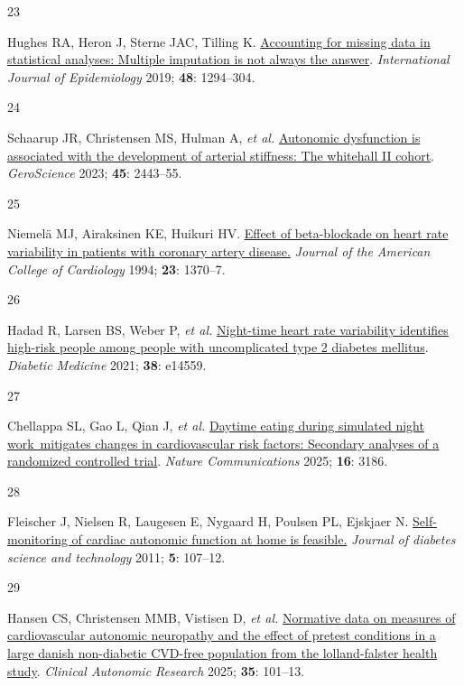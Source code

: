 \documentclass[
  a4paper,
  headsepline=true,
  open=any]{scrbook}
\newlength{\cslhangindent}
\newlength{\csllabelwidth}
\newlength{\cslentryspacingunit} %
\newenvironment{CSLReferences}[2] %
 {%
  \setlength{\parindent}{0pt}
  \ifodd #1
  \let\oldpar\par
  \def\par{\hangindent=\cslhangindent\oldpar}
  \fi
  \setlength{\parskip}{#2\cslentryspacingunit}
 }%
 {}
\newcommand{\CSLLeftMargin}[1]{\parbox[t]{\csllabelwidth}{#1}}
\newcommand{\CSLRightInline}[1]{\parbox[t]{\linewidth - \csllabelwidth}{#1}\break}
\begin{document}
\begin{CSLReferences}{0}{0}
\leavevmode{}%
\CSLLeftMargin{23 }%
\CSLRightInline{Hughes RA, Heron J, Sterne JAC, Tilling K.
\href{https://doi.org/10.1093/ije/dyz032}{Accounting for missing data in
statistical analyses: Multiple imputation is not always the answer}.
\emph{International Journal of Epidemiology} 2019; \textbf{48}:
1294--304.}

\leavevmode{}%
\CSLLeftMargin{24 }%
\CSLRightInline{Schaarup JR, Christensen MS, Hulman A, \emph{et al.}
\href{https://doi.org/10.1007/s11357-023-00762-0}{Autonomic dysfunction
is associated with the development of arterial stiffness: The whitehall
II cohort}. \emph{GeroScience} 2023; \textbf{45}: 2443--55.}

\leavevmode{}%
\CSLLeftMargin{25 }%
\CSLRightInline{Niemelä MJ, Airaksinen KE, Huikuri HV.
\href{https://doi.org/10.1016/0735-1097(94)90379-4}{Effect of
beta-blockade on heart rate variability in patients with coronary artery
disease.} \emph{Journal of the American College of Cardiology} 1994;
\textbf{23}: 1370--7.}

\leavevmode{}%
\CSLLeftMargin{26 }%
\CSLRightInline{Hadad R, Larsen BS, Weber P, \emph{et al.}
\href{https://doi.org/10.1111/dme.14559}{Night-time heart rate
variability identifies high-risk people among people with uncomplicated
type 2 diabetes mellitus}. \emph{Diabetic Medicine} 2021; \textbf{38}:
e14559.}

\leavevmode{}%
\CSLLeftMargin{27 }%
\CSLRightInline{Chellappa SL, Gao L, Qian J, \emph{et al.}
\href{https://doi.org/10.1038/s41467-025-57846-y}{Daytime eating during
simulated night work~mitigates changes in cardiovascular risk factors:
Secondary analyses of a randomized controlled trial}. \emph{Nature
Communications} 2025; \textbf{16}: 3186.}

\leavevmode{}%
\CSLLeftMargin{28 }%
\CSLRightInline{Fleischer J, Nielsen R, Laugesen E, Nygaard H, Poulsen
PL, Ejskjaer N.
\href{https://doi.org/10.1177/193229681100500115}{Self-monitoring of
cardiac autonomic function at home is feasible.} \emph{Journal of
diabetes science and technology} 2011; \textbf{5}: 107--12.}

\leavevmode{}%
\CSLLeftMargin{29 }%
\CSLRightInline{Hansen CS, Christensen MMB, Vistisen D, \emph{et al.}
\href{https://doi.org/10.1007/s10286-024-01069-6}{Normative data on
measures of cardiovascular autonomic neuropathy and the effect of
pretest conditions in a large danish non-diabetic CVD-free population
from the lolland-falster health study}. \emph{Clinical Autonomic
Research} 2025; \textbf{35}: 101--13.}


\end{CSLReferences}
\end{document}
